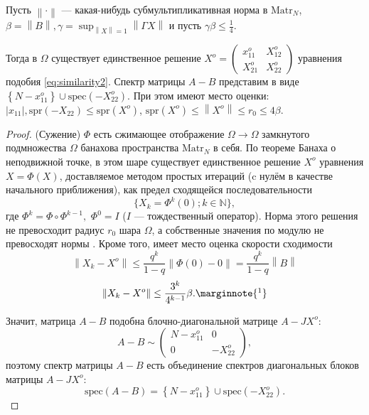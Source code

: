 \begin{lemma}
    Пусть \( {\left\|\cdot\right\|} \) --- какая-нибудь субмультипликативная норма в \( \mathrm{Matr}_{N} \),
    \( \beta={\left\|B\right\|}, \gamma=\sup_{{\left\|X\right\|}=1}{\left\|\Gamma X\right\|} \)
    и пусть
    \( \gamma\beta\leq\frac14. \)

    Тогда в \( \Omega \) существует единственное решение
    \( X^o = \begin{pmatrix}
        x_{11}^o & X_{12}^o \\
        X_{21}^o & X_{22}^o
    \end{pmatrix}\) уравнения подобия
    \eqref{eq:similarity2}.
    Спектр матрицы \( A - B \) представим в виде
    \( \left\{ N - x_{11}^o \right\} \cup \mathrm{spec}\left({-X_{22}^o}\right) \).
    При этом имеют место оценки:
    \( \lvert x_{11} \rvert, \mathrm{spr}\left({-X_{22}}\right) \leq \mathrm{spr}\left({X^o}\right) \),
    \(
        \mathrm{spr}\left({X^o}\right) \leq {\left\|X^o\right\|} \leq r_0 \leq 4\beta.
        \)
\end{lemma}
\begin{proof}
    (Сужение) \( \Phi \) есть сжимающее отображение \( \Omega\to\Omega \)
    замкнутого подмножества \( \Omega \)
    банахова пространства \( \mathrm{Matr}_{N} \) в себя.
    По теореме Банаха о неподвижной точке, в этом шаре существует единственное решение \( X^o \)
    уравнения \( X = \Phi (X) \),
    доставляемое методом простых итераций (c нулём в качестве начального приближения),
    как предел сходящейся последовательности
    \[
        \{X_k = \Phi^k(0); k\in\mathbb{N}\},
        \]
    где \( \Phi^k = \Phi \circ \Phi^{k-1}, \)
    \( \Phi^0 = I \) (\( I \) --- тождественный оператор).
    Норма этого решения не превосходит радиус \( r_0 \) шара \( \Omega \),
    а собственные значения по модулю не превосходят нормы \cite{baskakov-harmonic}.
    Кроме того, имеет место оценка скорости сходимости
    \[
        {\left\|X_k - X^o\right\|} \leq \frac{q^k}{1-q} {\left\|\Phi(0) - 0\right\|} = \frac{q^k}{1-q}{\left\|B\right\|}
        \]
    \[
        {\left\|X_k - X^o\right\|} \leq \frac{3^k}{4^{k-1}}\beta. \marginnote{\footnotemark}
        \]

    Значит, матрица \( A-B \) подобна блочно-диагональной матрице \( A - JX^o \):
    \[
        A-B \sim
    \begin{pmatrix}
        N - x_{11}^o & 0 \\
        0            & -X_{22}^o
    \end{pmatrix},
    \]
    поэтому спектр матрицы \( A - B \) есть объединение спектров
    диагональных блоков матрицы \( A - JX^o \):
    \[ \mathrm{spec}\left({A-B}\right) = \left\{N - x_{11}^o\right\} \cup \mathrm{spec}\left({-X_{22}^o}\right). \]
\end{proof}
